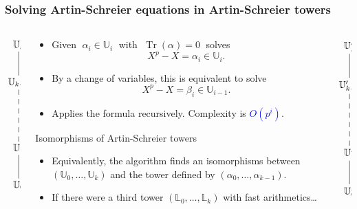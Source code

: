 \documentclass[10pt]{beamer}
\newcommand{\blue}[1]{\textcolor{blue}{#1}}  %
\newcommand{\LK}{\mathbb{L}}  %
\newcommand{\U}{\mathbb{U}}  %
\DeclareMathOperator{\Tr}{Tr}  %
\newcommand{\0}{\mathcal{O}}  %
\begin{document}
\begin{frame}
  \frametitle{Solving Artin-Schreier equations in Artin-Schreier towers}

  \begin{columns}
    \begin{column}{0.1\textwidth}
      \Large\[\xymatrix{
        \U_k\ar@{-}[d]\\
        \U_{k-1} \ar@{--}[dd]\\
        \\
        \U_1 \ar@{-}[d]\\
        \U_0
      }\]
    \end{column}
    \begin{column}{0.75\textwidth}
      \begin{block}{\cite{Couveignes00}}
        \begin{itemize}
        \item Given $\;\alpha_i\in\U_i\;$ with $\;\Tr(\alpha)=0\;$ solves
          \[X^p-X=\alpha_i\in\U_i\text{.}\]
        \item By a change of variables, this is equivalent to solve
          \[X^p-X=\beta_i\in\U_{i-1}\text{.}\]
        \item Applies the formula recursively. Complexity is
          \blue{$O(p^i)$}.
        \end{itemize}
      \end{block}

      \begin{block}{Isomorphisms of Artin-Schreier towers}
        \begin{itemize}
        \item Equivalently, the algorithm finds an isomorphisms
          between $(\U_0,\ldots,\U_k)$ and the tower defined by
          $(\alpha_0,\ldots,\alpha_{k-1})$.
        \item If there were a third tower $(\LK_0,\ldots,\LK_k)$ with
          fast arithmetics\dots
        \end{itemize}
      \end{block}
    \end{column}
    \begin{column}{0.1\textwidth}
      \Large\[\xymatrix{
        \U_k'\ar@{-}[d]\\
        \U_{k-1}' \ar@{--}[dd]\\
        \\
        \U_1' \ar@{-}[d]\\
        \U_0'
      }\]
    \end{column}
  \end{columns}
\end{frame}
\end{document}
